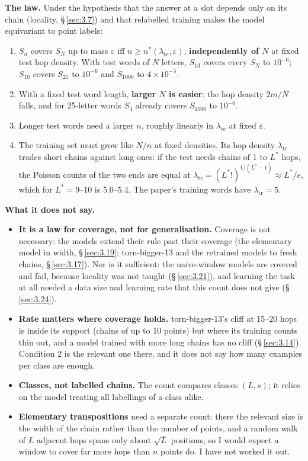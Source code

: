 \documentclass[paper=a4,fontsize=11pt,DIV=11,parskip=half,headings=small,numbers=noendperiod]{scrartcl}
\DeclareRobustCommand{\lead}[1]{\textsf{\bfseries\color{accent}#1}}
\DeclareRobustCommand{\code}[1]{{\fontseries{m}\ttfamily #1}}
\begin{document}
\lead{The law.} Under the hypothesis that the answer at a slot depends only on its chain (locality,
\S\,\ref{sec:3.7}) and that relabelled training makes the model equivariant to point labels:

\begin{enumerate}
\item $S_n$ covers $S_N$ up to mass $\varepsilon$ iff $n\ge n^*(\lambda_{\text{te}},\varepsilon)$,
  \textbf{independently of $N$} at fixed test hop density. With test words of $N$ letters, $S_{13}$ covers every
  $S_N$ to $10^{-6}$; $S_{10}$ covers $S_{25}$ to $10^{-6}$ and $S_{1000}$ to $4\times10^{-5}$.
\item With a fixed test word length, \textbf{larger $N$ is easier}: the hop density $2m/N$ falls, and for
  25-letter words $S_4$ already covers $S_{1000}$ to $10^{-6}$.
\item Longer test words need a larger $n$, roughly linearly in $\lambda_{\text{te}}$ at fixed $\varepsilon$.
\item The training set must grow like $N/n$ at fixed densities. Its hop density $\lambda_{\text{tr}}$ trades
  short chains against long ones: if the test needs chains of 1 to $L^*$ hops, the Poisson counts of the two
  ends are equal at $\lambda_{\text{tr}}=(L^*!)^{1/(L^*-1)}\approx L^*/e$, which for $L^*=9$–10 is 5.0–5.4. The
  paper’s training words have $\lambda_{\text{tr}}=5$.
\end{enumerate}

\lead{What it does not say.}

\begin{itemize}
\item \lead{It is a law for coverage, not for generalisation.} Coverage is not necessary: the models extend
  their rule past their coverage (the elementary model in width, \S\,\ref{sec:3.19};
  \code{torn-\allowbreak{}bigger-\allowbreak{}13} and the retrained models to fresh chains, \S\,\ref{sec:3.17}).
  Nor is it sufficient: the naive-window models are covered and fail, because locality was not taught
  (\S\,\ref{sec:3.21}), and learning the task at all needed a data size and learning rate that this count does
  not give (\S\,\ref{sec:3.24}).
\item \lead{Rate matters where coverage holds.} \code{torn-\allowbreak{}bigger-\allowbreak{}13}’s cliff at 15–20
  hops is inside its support (chains of up to 10 points) but where its training counts thin out, and a model
  trained with more long chains has no cliff (\S\,\ref{sec:3.14}). Condition 2 is the relevant one there, and it
  does not say how many examples per class are enough.
\item \lead{Classes, not labelled chains.} The count compares classes $(L,s)$; it relies on the model treating
  all labellings of a class alike.
\item \lead{Elementary transpositions} need a separate count: there the relevant size is the width of the chain
  rather than the number of points, and a random walk of $L$ adjacent hops spans only about $\sqrt{L}$
  positions, so I would expect a window to cover far more hops than $n$ points do. I have not worked it out.
\end{itemize}
\end{document}
